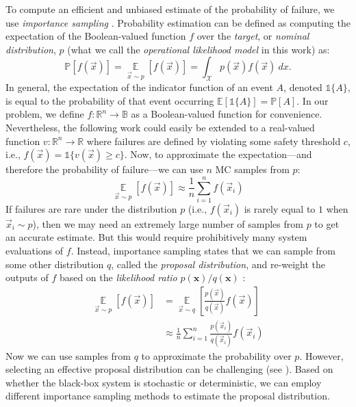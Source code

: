 To compute an efficient and unbiased estimate of the probability of failure, we use \textit{importance sampling} \cite{owen2013monte}.
Probability estimation can be defined as computing the expectation of the Boolean-valued function $f$ over the \textit{target}, or \textit{nominal distribution}, $p$ (what we call the \textit{operational likelihood model} in this work) as:
\begin{equation}\label{eq:expectation}
    \mathbb{P}[f(\vec{x})] = \operatorname*{\mathbb{E}}_{\vec{x} \sim p}[f(\vec{x})] = \int_\mathcal{X} p(\vec{x})f(\vec{x}) \ dx.
\end{equation}
In general, the expectation of the indicator function of an event $A$, denoted $\mathds{1}\{A\}$, is equal to the probability of that event occurring $\mathbb{E}[\mathds{1}\{A\}] = \mathbb{P}[A]$.
In our problem, we define $f: \mathbb{R}^n \to \mathbb{B}$ as a Boolean-valued function for convenience.
Nevertheless, the following work could easily be extended to a real-valued function $v: \mathbb{R}^n \to \mathbb{R}$ where failures are defined by violating some safety threshold $c$, i.e., $f(\vec{x}) = \mathds{1}\{v(\vec{x}) \ge c\}$.
Now, to approximate the expectation---and therefore the probability of failure---we can use $n$ MC samples from $p$:
\begin{equation}
    \operatorname*{\mathbb{E}}_{\vec{x} \sim p}[f(\vec{x})] \approx \frac{1}{n} \sum_{i=1}^n f(\vec{x}_i)
\end{equation}
If failures are rare under the distribution $p$ (i.e., $f(\vec{x}_i)$ is rarely equal to $1$ when $\vec{x}_i \sim p$), then we may need an extremely large number of samples from $p$ to get an accurate estimate.
But this would require prohibitively many system evaluations of $f$. 
Instead, importance sampling states that we can sample from some other distribution $q$, called the \textit{proposal distribution}, and re-weight the outputs of $f$ based on the \textit{likelihood ratio} $p(\mathbf{x})/q(\mathbf{x})$ \cite{owen2013monte}:
\begin{align}
    \operatorname*{\mathbb{E}}_{\vec{x} \sim p}[f(\vec{x})] &= \operatorname*{\mathbb{E}}_{\vec{x} \sim q}\left[\frac{p(\vec{x})}{q(\vec{x})}f(\vec{x})\right] \\
    &\approx \frac{1}{n} \sum_{i=1}^n \frac{p(\vec{x}_i)}{q(\vec{x}_i)}f(\vec{x}_i)
\end{align}
Now we can use samples from $q$ to approximate the probability over $p$.
However, selecting an effective proposal distribution can be challenging (see \textcite{bugallo2017adaptive}).
Based on whether the black-box system is stochastic or deterministic, we can employ different importance sampling methods to estimate the proposal distribution.

